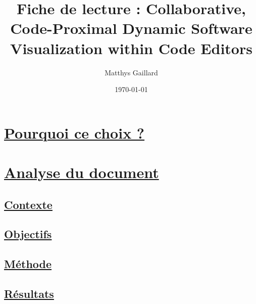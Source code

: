\documentclass[a4paper,10pt, oneside]{article}
\title{Fiche de lecture : Collaborative, Code-Proximal Dynamic Software Visualization within Code Editors}
\author{Matthys Gaillard}
\date{\today}
\begin{document}
\maketitle
\section{\ul{Pourquoi ce choix ?}}
\section{\ul{Analyse du document}}
\subsection{\ul{Contexte}}
  \subsection{\ul{Objectifs}}
               
\subsection{\ul{Méthode}}
       \subsection{\ul{Résultats}}



\end{document}
